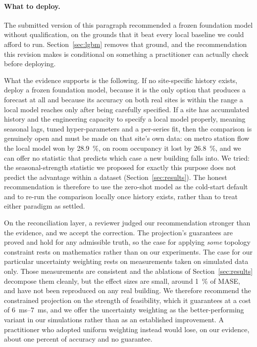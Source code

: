 \documentclass[11pt]{article}
\theoremstyle{plain}
\theoremstyle{definition}
\theoremstyle{remark}
\newif\ifrevisionmarkup
\newcommand{\new}[1]{\ifrevisionmarkup\textcolor{revision}{#1}\else#1\fi}
\begin{document}
\paragraph{What to deploy.}
\new{The submitted version of this paragraph recommended a frozen foundation model without qualification, on the grounds that it beat every local baseline we could afford to run. Section~\ref{sec:lgbm} removes that ground, and the recommendation this revision makes is conditional on something a practitioner can actually check before deploying.}

\new{What the evidence supports is the following. If no site-specific history exists, deploy a frozen foundation model, because it is the only option that produces a forecast at all and because its accuracy on both real sites is within the range a local model reaches only after being carefully specified. If a site has accumulated history and the engineering capacity to specify a local model properly, meaning seasonal lags, tuned hyper-parameters and a per-series fit, then the comparison is genuinely open and must be made on that site's own data: on metro station flow the local model won by \SI{28.9}{\percent}, on room occupancy it lost by \SI{26.8}{\percent}, and we can offer no statistic that predicts which case a new building falls into. We tried: the seasonal-strength statistic we proposed for exactly this purpose does not predict the advantage within a dataset (Section~\ref{sec:results}). The honest recommendation is therefore to use the zero-shot model as the cold-start default and to re-run the comparison locally once history exists, rather than to treat either paradigm as settled.}

\new{On the reconciliation layer, a reviewer judged our recommendation stronger than the evidence, and we accept the correction. The projection's guarantees are proved and hold for any admissible truth, so the case for applying \emph{some} topology constraint rests on mathematics rather than on our experiments. The case for our particular uncertainty weighting rests on measurements taken on simulated data only. Those measurements are consistent and the ablations of Section~\ref{sec:results} decompose them cleanly, but the effect sizes are small, around \SI{1}{\percent} of MASE, and have not been reproduced on any real building. We therefore recommend the constrained projection on the strength of feasibility, which it guarantees at a cost of \SIrange{6}{7}{\milli\second}, and we offer the uncertainty weighting as the better-performing variant in our simulations rather than as an established improvement. A practitioner who adopted uniform weighting instead would lose, on our evidence, about one percent of accuracy and no guarantee.}
\end{document}
